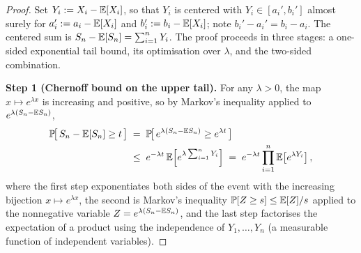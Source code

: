 \begin{proof}
Set $Y_i := X_i - \mathbb{E}[X_i]$, so that $Y_i$ is centered with $Y_i \in [a_i', b_i']$
almost surely for $a_i' := a_i - \mathbb{E}[X_i]$ and $b_i' := b_i - \mathbb{E}[X_i]$; note
$b_i' - a_i' = b_i - a_i$. The centered sum is $S_n - \mathbb{E}[S_n] = \sum_{i=1}^n Y_i$.
The proof proceeds in three stages: a one-sided exponential tail bound, its
optimisation over $\lambda$, and the two-sided combination.

\smallskip\noindent\textbf{Step 1 (Chernoff bound on the upper tail).}
For any $\lambda > 0$, the map $x \mapsto e^{\lambda x}$ is increasing and
positive, so by Markov's inequality applied to $e^{\lambda(S_n - \mathbb{E} S_n)}$,
\begin{align}
\mathbb{P}\!\big[\, S_n - \mathbb{E}[S_n] \ge t \,\big]
&\;=\; \mathbb{P}\!\big[\, e^{\lambda (S_n - \mathbb{E} S_n)} \ge e^{\lambda t} \,\big] \notag \\
&\;\le\; e^{-\lambda t} \, \mathbb{E}\!\left[ e^{\lambda \sum_{i=1}^n Y_i} \right]
   \;=\; e^{-\lambda t} \prod_{i=1}^n \mathbb{E}\!\left[ e^{\lambda Y_i} \right], \label{eq:chernoff}
\end{align}
where the first step exponentiates both sides of the event with the increasing
bijection $x \mapsto e^{\lambda x}$, the second is Markov's inequality
$\mathbb{P}[Z \ge s] \le \mathbb{E}[Z]/s$ applied to the nonnegative variable
$Z = e^{\lambda(S_n - \mathbb{E} S_n)}$, and the last step factorises the expectation of
a product using the independence of $Y_1, \ldots, Y_n$ (a measurable function of
independent variables).


\end{proof}
